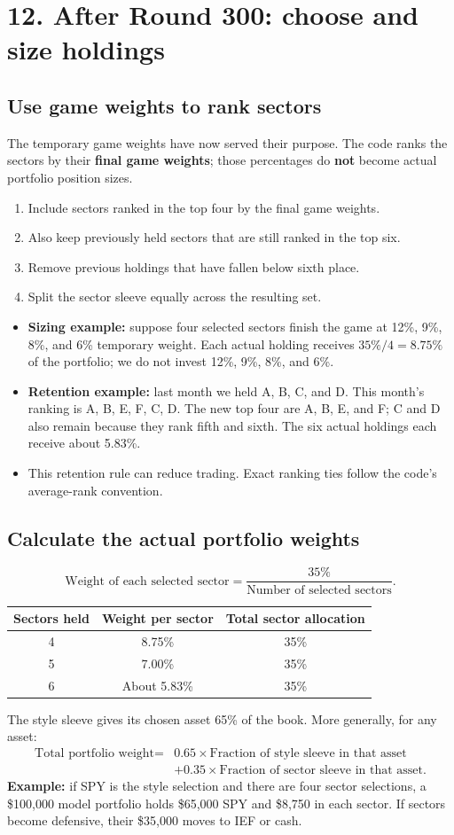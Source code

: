 \documentclass[11pt,letterpaper]{article}
\newcommand{\topic}[1]{\Needspace{5\baselineskip}\subsection*{#1}}
\newcommand{\word}[1]{\text{#1}}
\newcommand{\guidepage}[1]{\clearpage\section*{#1}}
\begin{document}
\guidepage{12. After Round 300: choose and size holdings}
\topic{Use game weights to rank sectors}
The temporary game weights have now served their purpose. The code ranks the sectors by their \textbf{final game weights}; those percentages do \textbf{not} become actual portfolio position sizes.
\begin{enumerate}
\item Include sectors ranked in the top four by the final game weights.
\item Also keep previously held sectors that are still ranked in the top six.
\item Remove previous holdings that have fallen below sixth place.
\item Split the sector sleeve equally across the resulting set.
\end{enumerate}
\begin{itemize}
\item \textbf{Sizing example:} suppose four selected sectors finish the game at 12\%, 9\%, 8\%, and 6\% temporary weight. Each actual holding receives $35\%/4=8.75\%$ of the portfolio; we do not invest 12\%, 9\%, 8\%, and 6\%.
\item \textbf{Retention example:} last month we held A, B, C, and D. This month's ranking is A, B, E, F, C, D. The new top four are A, B, E, and F; C and D also remain because they rank fifth and sixth. The six actual holdings each receive about 5.83\%.
\item This retention rule can reduce trading. Exact ranking ties follow the code's average-rank convention.
\end{itemize}

\topic{Calculate the actual portfolio weights}
\[
\word{Weight of each selected sector}
=\frac{35\%}{\word{Number of selected sectors}}.
\]
\begin{center}
\begin{tabular}{@{}ccc@{}}
\toprule
\textbf{Sectors held} & \textbf{Weight per sector} & \textbf{Total sector allocation}\\
\midrule
4 & 8.75\% & 35\%\\
5 & 7.00\% & 35\%\\
6 & About 5.83\% & 35\%\\
\bottomrule
\end{tabular}
\end{center}
The style sleeve gives its chosen asset 65\% of the book. More generally, for any asset:
\[
\begin{aligned}
\word{Total portfolio weight}={}&0.65\times\word{Fraction of style sleeve in that asset}\\
&+0.35\times\word{Fraction of sector sleeve in that asset}.
\end{aligned}
\]
\textbf{Example:} if SPY is the style selection and there are four sector selections, a \$100,000 model portfolio holds \$65,000 SPY and \$8,750 in each sector. If sectors become defensive, their \$35,000 moves to IEF or cash.
\end{document}
